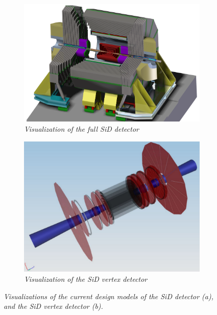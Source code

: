 \begin{figure}[!h]
\centering
\begin{subfigure}[t]{0.45\textwidth}
\centering
\includegraphics[width=1.05\textwidth]{figures/SiD_new.png}
\caption{\textit{Visualization of the full SiD detector}}
\end{subfigure}
\hspace*{0.3cm}
\begin{subfigure}[t]{0.45\textwidth}
\centering
\includegraphics[width=1.05\textwidth]{figures/SiDVertexDetector.png}
\caption{\textit{Visualization of the SiD vertex detector}}
\end{subfigure}
\caption{\textit{Visualizations of the current design models of the SiD detector (a), and the SiD vertex detector (b).}}
\label{fig:SiD}
\end{figure}


